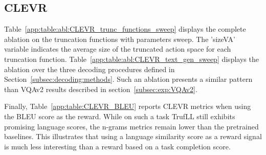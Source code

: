 \documentclass{article}
\newcommand{\algo}{TrufLL\xspace}
\begin{document}
\subsection{CLEVR}
Table~\ref{app:table:abl:CLEVR_trunc_functions_sweep} displays the complete ablation on the truncation functions with parameters sweep. The 'sizeVA' variable indicates the average size of the truncated action space for each truncation function. Table~\ref{app:table:abl:CLEVR_text_gen_sweep} displays the ablation over the three decoding procedures defined in Section~\ref{subsec:decoding:methods}.
Such an ablation presents a similar pattern than VQAv2 results described in section~\ref{subsec:exp:VQAv2}.  

Finally, Table~\ref{app:table:CLEVR_BLEU} reports CLEVR metrics when using the BLEU score as the reward. While on such a task \algo still exhibits promising language scores, the n-grams metrics remain lower than the pretrained baselines. This illustrates that using a language similarity score as a reward signal is much less interesting than a reward based on a task completion score. 
\end{document}
